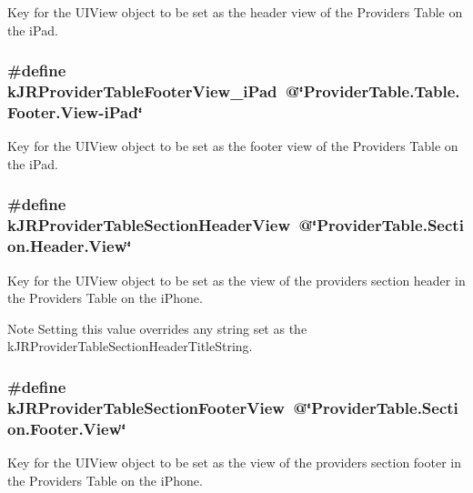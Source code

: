 Key for the {\ttfamily UIView} object to be set as the header view of the Providers Table on the iPad. \hypertarget{group__custom_interface_gaa23a63165d46433e2ec24ba44ef771da}{
\subsubsection[{kJRProviderTableFooterView\_\-iPad}]{\setlength{\rightskip}{0pt plus 5cm}\#define kJRProviderTableFooterView\_\-iPad~@\char`\"{}ProviderTable.Table.Footer.View-\/iPad\char`\"{}}}
\label{group__custom_interface_gaa23a63165d46433e2ec24ba44ef771da}
Key for the {\ttfamily UIView} object to be set as the footer view of the Providers Table on the iPad. \hypertarget{group__custom_interface_gaaff8ebdd2b9badb1d0a019a71d47db46}{
\subsubsection[{kJRProviderTableSectionHeaderView}]{\setlength{\rightskip}{0pt plus 5cm}\#define kJRProviderTableSectionHeaderView~@\char`\"{}ProviderTable.Section.Header.View\char`\"{}}}
\label{group__custom_interface_gaaff8ebdd2b9badb1d0a019a71d47db46}
Key for the {\ttfamily UIView} object to be set as the view of the providers section header in the Providers Table on the iPhone.

\begin{DoxyNote}{Note}
Setting this value overrides any string set as the kJRProviderTableSectionHeaderTitleString. 
\end{DoxyNote}
\hypertarget{group__custom_interface_ga984c096e9258dea402a1c27ae8bb6c8f}{
\subsubsection[{kJRProviderTableSectionFooterView}]{\setlength{\rightskip}{0pt plus 5cm}\#define kJRProviderTableSectionFooterView~@\char`\"{}ProviderTable.Section.Footer.View\char`\"{}}}
\label{group__custom_interface_ga984c096e9258dea402a1c27ae8bb6c8f}
Key for the {\ttfamily UIView} object to be set as the view of the providers section footer in the Providers Table on the iPhone.

